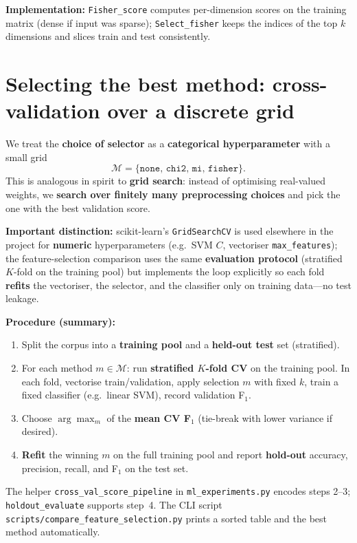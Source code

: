 \documentclass[11pt,a4paper]{report}
\begin{document}
\textbf{Implementation:} \texttt{Fisher\_score} computes per-dimension scores on the training matrix (dense if input was sparse); \texttt{Select\_fisher} keeps the indices of the top $k$ dimensions and slices train and test consistently.

\section{Selecting the best method: cross-validation over a discrete grid}

We treat the \textbf{choice of selector} as a \textbf{categorical hyperparameter} with a small grid
\[
    \mathcal{M} = \{\texttt{none},\, \texttt{chi2},\, \texttt{mi},\, \texttt{fisher}\}.
\]
This is analogous in spirit to \textbf{grid search}: instead of optimising real-valued weights, we \textbf{search over finitely many preprocessing choices} and pick the one with the best validation score.

\textbf{Important distinction:} scikit-learn's \texttt{GridSearchCV} is used elsewhere in the project for \textbf{numeric} hyperparameters (e.g.\ SVM $C$, vectoriser \texttt{max\_features}); the feature-selection comparison uses the same \textbf{evaluation protocol} (stratified $K$-fold on the training pool) but implements the loop explicitly so each fold \textbf{refits} the vectoriser, the selector, and the classifier only on training data---no test leakage.

\textbf{Procedure (summary):}
\begin{enumerate}[noitemsep]
    \item Split the corpus into a \textbf{training pool} and a \textbf{held-out test} set (stratified).
    \item For each method $m \in \mathcal{M}$: run \textbf{stratified $K$-fold CV} on the training pool. In each fold, vectorise train/validation, apply selection $m$ with fixed $k$, train a fixed classifier (e.g.\ linear SVM), record validation F$_1$.
    \item Choose $\arg\max_{m}$ of the \textbf{mean CV F$_1$} (tie-break with lower variance if desired).
    \item \textbf{Refit} the winning $m$ on the full training pool and report \textbf{hold-out} accuracy, precision, recall, and F$_1$ on the test set.
\end{enumerate}

\noindent
The helper \texttt{cross\_val\_score\_pipeline} in \texttt{ml\_experiments.py} encodes steps 2--3; \texttt{holdout\_evaluate} supports step~4. The CLI script \texttt{scripts/compare\_feature\_selection.py} prints a sorted table and the best method automatically.
\end{document}
